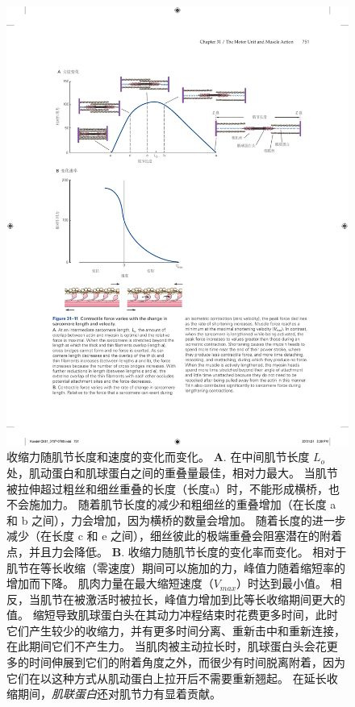 \begin{figure}[htbp]
	\centering
	\includegraphics[width=1.0\linewidth]{chap31/fig_31_11}
	\caption{收缩力随肌节长度和速度的变化而变化。
	\textbf{A}. 在中间肌节长度 $ L_o $ 处，肌动蛋白和肌球蛋白之间的重叠量最佳，相对力最大。
	当肌节被拉伸超过粗丝和细丝重叠的长度（长度a）时，不能形成横桥，也不会施加力。
	随着肌节长度的减少和粗细丝的重叠增加（在长度 a 和 b 之间），力会增加，因为横桥的数量会增加。
	随着长度的进一步减少（在长度 c 和 e 之间），细丝彼此的极端重叠会阻塞潜在的附着点，并且力会降低。
	\textbf{B}. 收缩力随肌节长度的变化率而变化。
	相对于肌节在等长收缩（零速度）期间可以施加的力，峰值力随着缩短率的增加而下降。
	肌肉力量在最大缩短速度（$ V_{max} $）时达到最小值。
	相反，当肌节在被激活时被拉长，峰值力增加到比等长收缩期间更大的值。
	缩短导致肌球蛋白头在其动力冲程结束时花费更多时间，此时它们产生较少的收缩力，并有更多时间分离、重新击中和重新连接，在此期间它们不产生力。
	当肌肉被主动拉长时，肌球蛋白头会花更多的时间伸展到它们的附着角度之外，而很少有时间脱离附着，因为它们在以这种方式从肌动蛋白上拉开后不需要重新翘起。
	在延长收缩期间，\textit{肌联蛋白}还对肌节力有显着贡献。}
	\label{fig:31_11}
\end{figure}


